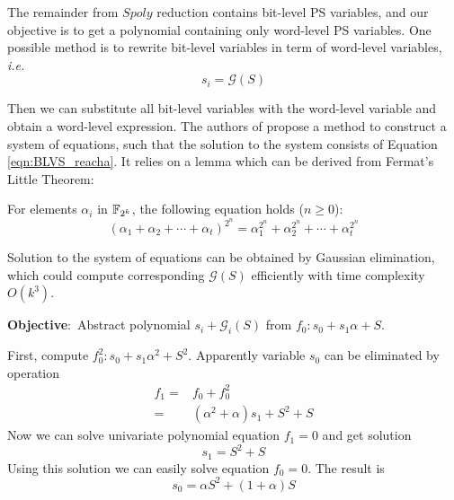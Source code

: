 The remainder from $Spoly$ reduction contains bit-level PS variables, and our objective is to get a polynomial 
containing only word-level PS variables. One possible method is 
to rewrite bit-level variables in term of word-level variables, {\it i.e.}
\begin{equation}
\label{eqn:BLVS_reacha}
s_i = \mathcal{G}(S)
\end{equation}

Then we can substitute all bit-level variables with the word-level variable
and obtain a word-level expression.
The authors of \cite{pruss:tcad15} propose a method to construct 
a system of equations, such that the solution to the system consists of Equation \ref{eqn:BLVS_reacha}.
It relies on a lemma which can be derived from Fermat's Little Theorem:
\begin{Lemma}
\label{lem:Fermat}
For elements $\alpha_i$ in ${\mathbb{F}}_{2^k}$, the following equation holds ($n\geq 0$):
$$(\alpha_1+\alpha_2+\cdots+\alpha_t)^{2^n} = \alpha_1^{2^n}+\alpha_2^{2^n}+\cdots+\alpha_t^{2^n}$$
\end{Lemma}

Solution to the system of equations can be obtained by Gaussian elimination, which could 
compute corresponding $\mathcal{G}(S)$ efficiently with time complexity $O(k^3)$.

\begin{Example}
{\bf Objective}:\ Abstract polynomial $s_i + \mathcal{G}_i(S)$ from $f_0: s_0+s_1\alpha+S$.

First, compute $f_0^2: s_0+s_1\alpha^2+S^2$. Apparently variable $s_0$ can be
eliminated by operation 
\begin{align}
f_1 =& f_0 + f_0^2 \nonumber\\
=&(\alpha^2+\alpha)s_1+S^2+S\nonumber
\end{align}
Now we can solve univariate polynomial equation $f_1 = 0$ and get solution
$$s_1 = S^2 + S$$
Using this solution we can easily solve equation $f_0 = 0$. The result is
$$s_0 = \alpha S^2+(1+\alpha)S$$
\end{Example}

